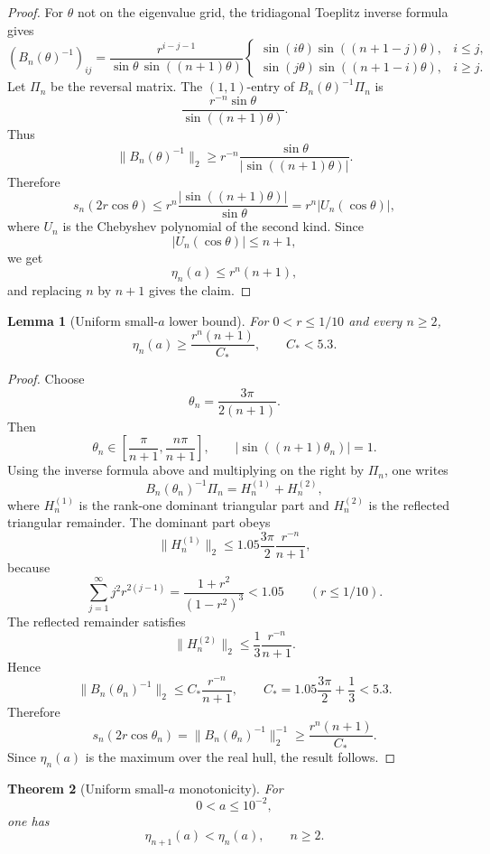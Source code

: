 \documentclass[11pt]{article}
\numberwithin{equation}{section}
\newtheorem{theorem}{Theorem}[section]
\newtheorem{lemma}[theorem]{Lemma}
\begin{document}
\begin{proof}
For \(\theta\) not on the eigenvalue grid, the tridiagonal Toeplitz inverse formula gives
\[
(B_n(\theta)^{-1})_{ij}
=
\frac{r^{i-j-1}}{\sin\theta\,\sin((n+1)\theta)}
\begin{cases}
\sin(i\theta)\sin((n+1-j)\theta),&i\le j,\\
\sin(j\theta)\sin((n+1-i)\theta),&i\ge j.
\end{cases}
\]
Let \(\Pi_n\) be the reversal matrix. The \((1,1)\)-entry of
\(B_n(\theta)^{-1}\Pi_n\) is
\[
\frac{r^{-n}\sin\theta}{\sin((n+1)\theta)}.
\]
Thus
\[
\|B_n(\theta)^{-1}\|_2
\ge
r^{-n}\frac{\sin\theta}{|\sin((n+1)\theta)|}.
\]
Therefore
\[
s_n(2r\cos\theta)
\le
r^n\frac{|\sin((n+1)\theta)|}{\sin\theta}
=
r^n|U_n(\cos\theta)|,
\]
where \(U_n\) is the Chebyshev polynomial of the second kind. Since
\[
|U_n(\cos\theta)|\le n+1,
\]
we get
\[
\eta_n(a)\le r^n(n+1),
\]
and replacing \(n\) by \(n+1\) gives the claim.
\end{proof}

\begin{lemma}[Uniform small-\(a\) lower bound]
\label{lem:small-lower}
For \(0<r\le1/10\) and every \(n\ge2\),
\[
\eta_n(a)\ge \frac{r^n(n+1)}{C_*},
\qquad
C_*<5.3.
\]
\end{lemma}

\begin{proof}
Choose
\[
\theta_n=\frac{3\pi}{2(n+1)}.
\]
Then
\[
\theta_n\in\left[\frac{\pi}{n+1},\frac{n\pi}{n+1}\right],
\qquad
|\sin((n+1)\theta_n)|=1.
\]
Using the inverse formula above and multiplying on the right by \(\Pi_n\), one writes
\[
B_n(\theta_n)^{-1}\Pi_n=H_n^{(1)}+H_n^{(2)},
\]
where \(H_n^{(1)}\) is the rank-one dominant triangular part and
\(H_n^{(2)}\) is the reflected triangular remainder. The dominant part obeys
\[
\|H_n^{(1)}\|_2
\le
1.05\frac{3\pi}{2}\frac{r^{-n}}{n+1},
\]
because
\[
\sum_{j=1}^\infty j^2r^{2(j-1)}
=
\frac{1+r^2}{(1-r^2)^3}
<1.05
\qquad (r\le1/10).
\]
The reflected remainder satisfies
\[
\|H_n^{(2)}\|_2
\le
\frac13\frac{r^{-n}}{n+1}.
\]
Hence
\[
\|B_n(\theta_n)^{-1}\|_2
\le
C_*\frac{r^{-n}}{n+1},
\qquad
C_*=
1.05\frac{3\pi}{2}+\frac13<5.3.
\]
Therefore
\[
s_n(2r\cos\theta_n)
=
\|B_n(\theta_n)^{-1}\|_2^{-1}
\ge
\frac{r^n(n+1)}{C_*}.
\]
Since \(\eta_n(a)\) is the maximum over the real hull, the result follows.
\end{proof}

\begin{theorem}[Uniform small-\(a\) monotonicity]
\label{thm:small-a}
For
\[
0<a\le10^{-2},
\]
one has
\[
\eta_{n+1}(a)<\eta_n(a),
\qquad n\ge2.
\]
\end{theorem}
\end{document}
